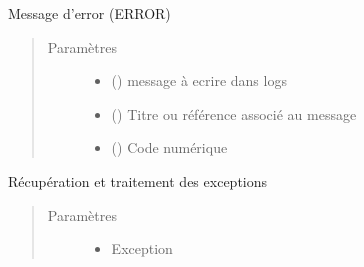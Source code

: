 \documentclass[letterpaper,10pt,french]{sphinxmanual}
\begin{document}
\begin{fulllineitems}
\begin{fulllineitems}
\begin{quote}
\begin{description}
\begin{itemize}
\end{itemize}

\end{description}\end{quote}

\end{fulllineitems}


\begin{fulllineitems}
\label{\detokenize{classes/cfgloader:toolbox.logmng.CTracker.error_tracking}}
Message d’error (ERROR)
\begin{quote}\begin{description}
\item[{Paramètres}] \leavevmode\begin{itemize}
\item {} 
 () \textendash{} message à ecrire dans logs

\item {} 
 () \textendash{} Titre ou référence associé au message

\item {} 
 () \textendash{} Code numérique

\end{itemize}

\end{description}\end{quote}

\end{fulllineitems}


\begin{fulllineitems}
\label{\detokenize{classes/cfgloader:toolbox.logmng.CTracker.exception_tracking}}
Récupération et traitement des exceptions
\begin{quote}\begin{description}
\item[{Paramètres}] \leavevmode\begin{itemize}
\item {} 
 \textendash{} Exception


\end{itemize}
\end{description}
\end{quote}
\end{fulllineitems}
\end{fulllineitems}
\end{document}
